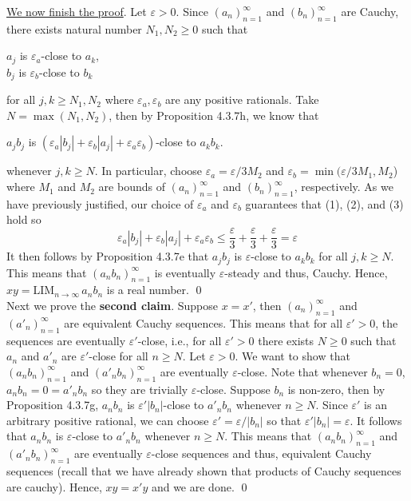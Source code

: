\documentclass{amsart}
\theoremstyle{definition}
\newcommand{\LIM}{\mathrm{LIM}_{n\to\infty}\,}
\begin{document}
\underline{We now finish the proof}. Let $\varepsilon>0$. Since $(a_n)_{n=1}^\infty$ and $(b_n)_{n=1}^\infty$ are Cauchy, there exists natural number $N_1,N_2\geq 0$ such that 
\begin{center}
    $a_j$ is $\varepsilon_a$-close to $a_k$, \\
    $b_j$ is $\varepsilon_b$-close to $b_k$
\end{center}
for all $j,k\geq N_1,N_2$ where $\varepsilon_a,\varepsilon_b$ are any positive rationals. Take $N=\max (N_1,N_2)$, then by Proposition 4.3.7h, we know that 
\begin{center}
$a_jb_j$ is $(\varepsilon_a|b_j|+\varepsilon_b|a_j|+\varepsilon_a\varepsilon_b)$-close to $a_kb_k$. 
\end{center}
whenever $j,k\geq N$. In particular, choose $\varepsilon_a=\varepsilon/3M_2$ and $\varepsilon_b=\min (\varepsilon/3M_1, M_2$) where $M_1$ and $M_2$ are bounds of $(a_n)_{n=1}^\infty$ and $(b_n)_{n=1}^\infty$, respectively. As we have previously justified, our choice of $\varepsilon_a$ and $\varepsilon_b$ guarantees that (1), (2), and (3) hold so 
\[
\varepsilon_a|b_j|+\varepsilon_b|a_j|+\varepsilon_a\varepsilon_b
\leq \frac{\varepsilon}{3}+\frac{\varepsilon}{3}+\frac{\varepsilon}{3}=\varepsilon
\]
It then follows by Proposition 4.3.7e that $a_jb_j$ is $\varepsilon$-close to $a_kb_k$ for all $j,k\geq N$. This means that $(a_nb_n)_{n=1}^\infty$ is eventually $\varepsilon$-steady and thus, Cauchy. Hence, $xy=\LIM a_nb_n$ is a real number. \qed \\

Next we prove the \textbf{second claim}. Suppose $x=x'$, then $(a_n)_{n=1}^\infty$ and $(a'_n)_{n=1}^\infty$ are equivalent Cauchy sequences. This means that for all $\varepsilon'>0$, the sequences are eventually $\varepsilon'$-close, i.e., for all $\varepsilon'>0$ there exists $N\geq 0$ such that $a_n$ and $a'_n$ are $\varepsilon'$-close for all $n\geq N$. Let $\varepsilon>0$. We want to show that $(a_nb_n)_{n=1}^\infty$ and $(a'_nb_n)_{n=1}^\infty$ are eventually $\varepsilon$-close. Note that whenever $b_n=0$, $a_nb_n=0=a'_nb_n$ so they are trivially $\varepsilon$-close. Suppose $b_n$ is non-zero, then by Proposition 4.3.7g, $a_nb_n$ is $\varepsilon'|b_n|$-close to $a'_nb_n$ whenever $n\geq N$. Since $\varepsilon'$ is an arbitrary positive rational, we can choose $\varepsilon'=\varepsilon/|b_n|$ so that $\varepsilon'|b_n|=\varepsilon$. It follows that $a_nb_n$ is $\varepsilon$-close to $a'_nb_n$ whenever $n\geq N$. This means that $(a_nb_n)_{n=1}^\infty$ and $(a'_nb_n)_{n=1}^\infty$ are eventually $\varepsilon$-close sequences and thus, equivalent Cauchy sequences (recall that we have already shown that products of Cauchy sequences are cauchy). Hence, $xy=x'y$ and we are done. \qed \\
\end{document}
